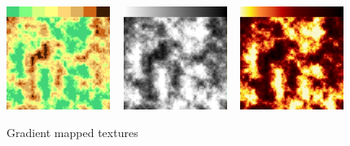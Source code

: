 \begin{figure}
        \centering
                \includegraphics[width=0.3\textwidth]{images/Theory/Perlin_Noise/gradient_discrete.png}
        ~ %
                \includegraphics[width=0.3\textwidth]{images/Theory/Perlin_Noise/gradient_grey.png}
        ~ %
                \includegraphics[width=0.3\textwidth]{images/Theory/Perlin_Noise/gradient_fire.png}
        \caption{Gradient mapped textures \cite{NoisesGAMES}}
        \label{fig:NTextures}
\end{figure}

